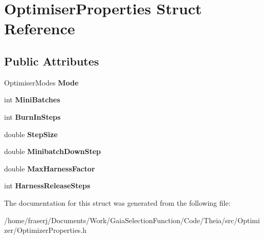 \hypertarget{structOptimiserProperties}{}\section{Optimiser\+Properties Struct Reference}
\label{structOptimiserProperties}
\subsection*{Public Attributes}
\begin{DoxyCompactItemize}
\item 
\mbox{\label{structOptimiserProperties_a95b49b57cd02916e840da511fa01e379}} 
Optimiser\+Modes {\bfseries Mode}
\item 
\mbox{\label{structOptimiserProperties_aacef8e01973bcece3214de56174778bb}} 
int {\bfseries Mini\+Batches}
\item 
\mbox{\label{structOptimiserProperties_a8d1a326eff70cb4d8472b334e95d8b07}} 
int {\bfseries Burn\+In\+Steps}
\item 
\mbox{\label{structOptimiserProperties_a8c385e907134c4491e8335bda1a51c1e}} 
double {\bfseries Step\+Size}
\item 
\mbox{\label{structOptimiserProperties_a7aa5f01db46d5aa68660babb57eb4068}} 
double {\bfseries Minibatch\+Down\+Step}
\item 
\mbox{\label{structOptimiserProperties_a6387c12bb01525748510c7e2dfed4339}} 
double {\bfseries Max\+Harness\+Factor}
\item 
\mbox{\label{structOptimiserProperties_a04b7f1577650e7a618a6dce076071123}} 
int {\bfseries Harness\+Release\+Steps}
\end{DoxyCompactItemize}


The documentation for this struct was generated from the following file\+:\begin{DoxyCompactItemize}
\item 
/home/fraserj/\+Documents/\+Work/\+Gaia\+Selection\+Function/\+Code/\+Theia/src/\+Optimizer/Optimizer\+Properties.\+h\end{DoxyCompactItemize}
